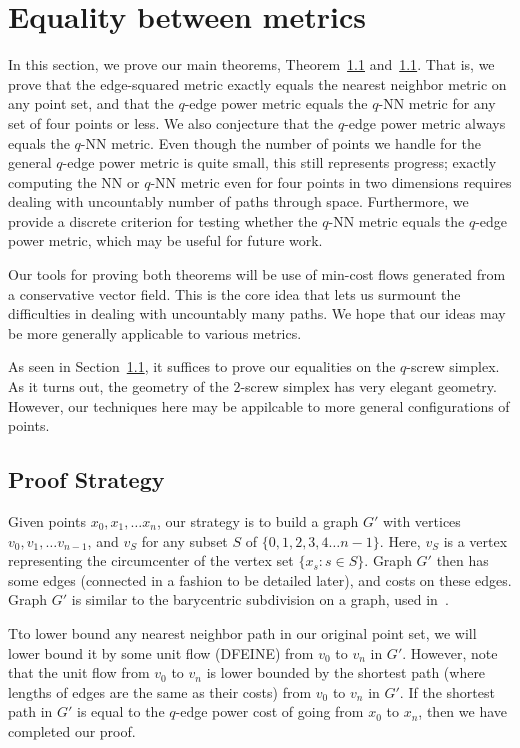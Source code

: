\section{Equality between metrics}

In this section, we prove our main theorems, Theorem~\ref{} and~\ref{}. That
is, we prove that the edge-squared metric exactly equals the nearest neighbor
metric on any point set, and that the $q$-edge power metric equals the $q$-NN
metric for any set of four points or less. We also conjecture that the $q$-edge
power metric always equals the $q$-NN metric. Even though the number of points
we handle for the general $q$-edge power metric is quite small, this still
represents progress; exactly computing the NN or $q$-NN metric even for four
points in two dimensions requires dealing with uncountably number of paths
through space. Furthermore, we provide a discrete criterion for testing whether
the $q$-NN metric equals the $q$-edge power metric, which may be useful for
future work.

Our tools for proving both theorems will be use of min-cost flows generated
from a conservative vector field. This is the core idea that lets us surmount
the difficulties in dealing with uncountably many paths. We hope that our ideas
may be more generally applicable to various metrics.

As seen in Section~\ref{}, it suffices to prove our equalities on the $q$-screw
simplex. As it turns out, the geometry of the $2$-screw simplex has very
elegant geometry. However, our techniques here may be appilcable to more
general configurations of points.

\subsection{Proof Strategy}

Given points $x_0, x_1, \ldots x_n$, our strategy is to build a graph $G'$ with
vertices $v_0, v_1, \ldots v_{n-1}$, and $v_S$ for any subset $S$ of
$\{0,1,2,3,4 \ldots n-1 \}$. Here, $v_S$ is a vertex representing the
circumcenter of the vertex set $\{x_s: s \in S\}$. Graph $G'$ then has some
edges (connected in a fashion to be detailed later), and costs on these edges.
Graph $G'$ is similar to the barycentric subdivision on a graph, used
in~\cite{}.

Tto lower bound any nearest neighbor path in our original point set, we will
lower bound it by some unit flow (DFEINE) from $v_0$ to $v_n$ in $G'$. However,
note that the unit flow from $v_0$ to $v_n$ is lower bounded by the shortest
path (where lengths of edges are the same as their costs) from $v_0$ to $v_n$
in $G'$. If the shortest path in $G'$ is equal to the $q$-edge power cost of
going from $x_0$ to $x_n$, then we have completed our proof.


